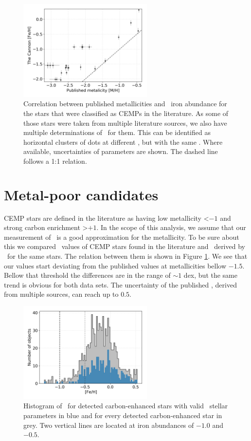 \begin{figure}
	\centering
	\includegraphics[width=0.6\textwidth]{cemps_meh_feh.png}
	\caption{Correlation between published metallicities and \TC\ iron abundance for the stars that were classified as CEMPs in the literature. As some of those stars were taken from multiple literature sources, we also have multiple determinations of \Meh\ for them. This can be identified as horizontal clusters of dots at different \Meh, but with the same \Feh. Where available, uncertainties of parameters are shown. The dashed line follows a 1:1 relation.}
	\label{fig:cemps_feh}
\end{figure}

\section{Metal-poor candidates}
\label{sec:cemp_cemp}
CEMP stars are defined in the literature as having low metallicity \Meh \textless $-1$ and strong carbon enrichment \Cfe \textgreater $+1$. In the scope of this analysis, we assume that our measurement of \Feh\ is a good approximation for the metallicity. To be sure about this we compared \Meh\ values of CEMP stars found in the literature and \Feh\ derived by \TC\ for the same stars. The relation between them is shown in Figure \ref{fig:cemps_feh}. We see that our values start deviating from the published values at metallicities bellow $-1.5$. Bellow that threshold the differences are in the range of $\sim1$ dex, but the same trend is obvious for both data sets. The uncertainty of the published \Meh, derived from multiple sources, can reach up to $0.5$. 

\begin{figure}
	\centering
	\includegraphics[width=0.6\textwidth]{Fe_H_cannon.png}
	\caption{Histogram of \Feh\ for detected carbon-enhanced stars with valid \TC\ stellar parameters in blue and for every detected carbon-enhanced star in grey. Two vertical lines are located at iron abundances of $-1.0$ and $-0.5$.}
	\label{fig:feh_candidates}
\end{figure}


